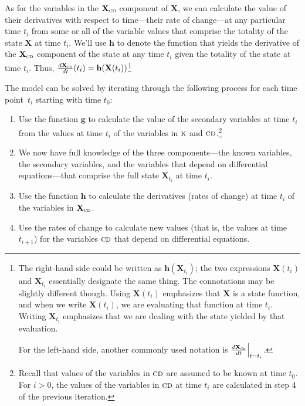 \documentclass{article}\usepackage[]{graphicx}\usepackage[]{color}
\newcommand{\boldX}{\mathbf{X}}
\newcommand{\cd}{\textsc{cd}}
\newcommand{\kn}{\textsc{k}} %
\newcommand{\g}{\mathbf{g}}
\newcommand{\h}{\mathbf{h}}
\begin{document}
As for the variables in the $\boldX_\cd$ component of $\boldX$, we can
calculate the value of their derivatives with respect to time---their
rate of change---at any particular time $t_i$ from some or all of the
variable values that comprise the totality of the state $\boldX$ at
time $t_i$.  We'll use $\h$ to denote the function that yields the
derivative of the $\boldX_\cd$ component of the state at any time
$t_i$ given the totality of the state at time $t_i$.  Thus,
$\frac{d\boldX_\cd}{dt}(t_i) = \h(\boldX(t_i))$\footnote{The
  right-hand side could be written as $\h(\boldX_{t_i})$; the two
  expressions $\boldX(t_i)$ and $\boldX_{t_i}$ essentially designate
  the same thing.  The connotations may be slightly different though.
  Using $\boldX(t_i)$ emphasizes that $\boldX$ is a state function,
  and when we write $\boldX(t_i)$, we are evaluating that function at
  time $t_i$. Writing $\boldX_{t_i}$ emphasizes that we are dealing
  with the state yielded by that evaluation.

For the left-hand side, another commonly used notation is
$\frac{d\boldX_\cd}{dt}{\Big\vert}_{t=t_i}$.}

The model can be solved by iterating through the following process for
each time point\ $t_i$ starting with time $t_0$:

\begin{enumerate}

\item Use the function $\g$ to calculate the value of the secondary
  variables at time $t_i$ from the values at time $t_i$ of the
  variables in $\kn$ and $\cd$.\footnote{Recall that values of the
    variables in $\cd$ are assumed to be known at time $t_0$.  For
    $i>0$, the values of the variables in $\cd$ at time $t_i$ are
    calculated in step 4 of the previous iteration.}

\item We now have full knowledge of the three components---the known
  variables, the secondary variables, and the variables that depend on
  differential equations---that comprise the full state $\boldX_{t_i}$
  at time $t_i$.

\item Use the function $\h$ to calculate the derivatives (rates of
  change) at time $t_i$ of the variables in $\boldX_\cd$.

\item Use the rates of change to calculate new values (that is, the
  values at time $t_{i+1}$) for the variables $\cd$ that depend on
  differential equations.

\end{enumerate}
\end{document}
